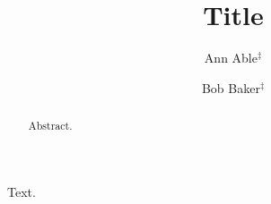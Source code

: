 \documentclass{revtex4-2}
\begin{document}
\title{Title}
\author{Ann Able$^\ddagger$}
\author{Bob Baker$^\ddagger$}
\begin{abstract}Abstract.\end{abstract}
\maketitle
Text.
\end{document}
